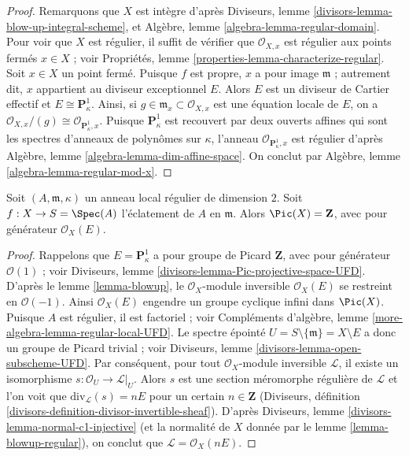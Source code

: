 \begin{proof} Remarquons que $X$ est intègre d'après Diviseurs, lemme \ref{divisors-lemma-blow-up-integral-scheme}, et Algèbre, lemme \ref{algebra-lemma-regular-domain}. Pour voir que $X$ est régulier, il suffit de vérifier que $\mathcal{O}_{X, x}$ est régulier aux points fermés $x \in X$ ; voir Propriétés, lemme \ref{properties-lemma-characterize-regular}. Soit $x \in X$ un point fermé. Puisque $f$ est propre, $x$ a pour image $\mathfrak m$ ; autrement dit, $x$ appartient au diviseur exceptionnel $E$. Alors $E$ est un diviseur de Cartier effectif et $E \cong \mathbf{P}^1_\kappa$. Ainsi, si $g \in \mathfrak m_x \subset \mathcal{O}_{X, x}$ est une équation locale de $E$, on a $\mathcal{O}_{X, x}/(g) \cong \mathcal{O}_{\mathbf{P}^1_\kappa, x}$. Puisque $\mathbf{P}^1_\kappa$ est recouvert par deux ouverts affines qui sont les spectres d'anneaux de polynômes sur $\kappa$, l'anneau $\mathcal{O}_{\mathbf{P}^1_\kappa, x}$ est régulier d'après Algèbre, lemme \ref{algebra-lemma-dim-affine-space}. On conclut par Algèbre, lemme \ref{algebra-lemma-regular-mod-x}. \end{proof}

\begin{lemma} \label{lemma-blowup-pic} Soit $(A, \mathfrak m, \kappa)$ un anneau local régulier de dimension $2$. Soit $f : X \to S = \Spec(A)$ l'éclatement de $A$ en $\mathfrak m$. Alors $\Pic(X) = \mathbf{Z}$, avec pour générateur $\mathcal{O}_X(E)$. \end{lemma}

\begin{proof} Rappelons que $E = \mathbf{P}^1_\kappa$ a pour groupe de Picard $\mathbf{Z}$, avec pour générateur $\mathcal{O}(1)$ ; voir Diviseurs, lemme \ref{divisors-lemma-Pic-projective-space-UFD}. D'après le lemme \ref{lemma-blowup}, le $\mathcal{O}_X$-module inversible $\mathcal{O}_X(E)$ se restreint en $\mathcal{O}(-1)$. Ainsi $\mathcal{O}_X(E)$ engendre un groupe cyclique infini dans $\Pic(X)$. Puisque $A$ est régulier, il est factoriel ; voir Compléments d'algèbre, lemme \ref{more-algebra-lemma-regular-local-UFD}. Le spectre épointé $U = S \setminus \{\mathfrak m\} = X \setminus E$ a donc un groupe de Picard trivial ; voir Diviseurs, lemme \ref{divisors-lemma-open-subscheme-UFD}. Par conséquent, pour tout $\mathcal{O}_X$-module inversible $\mathcal{L}$, il existe un isomorphisme $s : \mathcal{O}_U \to \mathcal{L}|_U$. Alors $s$ est une section méromorphe régulière de $\mathcal{L}$ et l'on voit que $\text{div}_\mathcal{L}(s) = nE$ pour un certain $n \in \mathbf{Z}$ (Diviseurs, définition \ref{divisors-definition-divisor-invertible-sheaf}). D'après Diviseurs, lemme \ref{divisors-lemma-normal-c1-injective} (et la normalité de $X$ donnée par le lemme \ref{lemma-blowup-regular}), on conclut que $\mathcal{L} = \mathcal{O}_X(nE)$. \end{proof}

